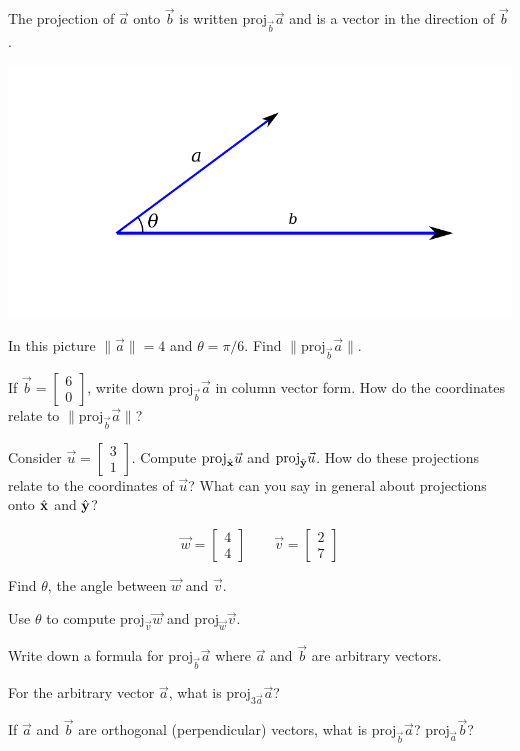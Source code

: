 \documentclass{article}
\newcommand{\xh}{\hat{\bf x}}
\newcommand{\yh}{\hat{\bf y}}
\newcommand{\proj}{\mathrm{proj}}
\begin{document}
	The projection of $\vec a$ onto $\vec b$ is written $\proj_{\vec b}\vec a$ and is a vector in the direction of $\vec b$.

	\includegraphics{projection2.pdf}
	
	\begin{Enum}
		\item In this picture $\|\vec a\|=4$ and $\theta = \pi/6$.  Find $\|\proj_{\vec b}\vec a\|$.
		\item If $\vec b=\begin{bmatrix}6\\0\end{bmatrix}$, write down $\proj_{\vec b}\vec a$ in column vector
		form.  How do the coordinates relate to $\|\proj_{\vec b}\vec a\|$?
		\item Consider $\vec u=\begin{bmatrix}3\\1\end{bmatrix}$.  Compute $\proj_{\xh}\vec u$ and 
		$\proj_{\yh}\vec u$.  How do these projections relate to the coordinates of $\vec u$? What
		can you say in general about projections onto $\xh$ and $\yh$?
	\end{Enum}

	\[
		\vec w = \begin{bmatrix}4\\4\end{bmatrix}\qquad \vec v=\begin{bmatrix}2\\7\end{bmatrix}
	\]
	\begin{Enum}
		\item Find $\theta$, the angle between $\vec w$ and $\vec v$.
		\item Use $\theta$ to compute $\proj_{\vec v}\vec w$ and $\proj_{\vec w}\vec v$.
		\item Write down a formula for $\proj_{\vec b}\vec a$ where $\vec a$ and $\vec b$ are
		arbitrary vectors.
	\end{Enum}
	\begin{Enum}
		\item For the arbitrary vector $\vec a$, what is $\proj_{3\vec a}\vec a$?
		\item If $\vec a$ and $\vec b$ are orthogonal (perpendicular) vectors,
		what is $\proj_{\vec b}\vec a$? $\proj_{\vec a}\vec b$?
	\end{Enum}
	
\end{document}
